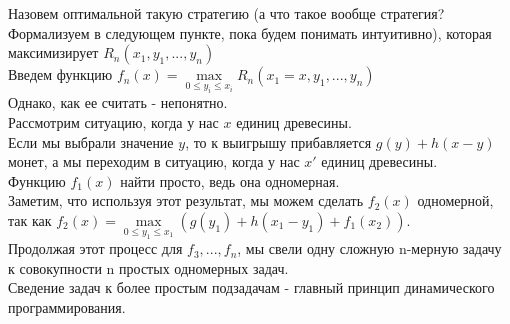 Назовем оптимальной такую стратегию (а что такое вообще стратегия? Формализуем в следующем пункте, пока будем понимать интуитивно), которая максимизирует $R_n(x_1, y_1, ..., y_n)$\\
Введем функцию $f_n(x) = \max\limits_{0 \leq y_i \leq x_i}R_n(x_1 = x, y_1, ..., y_n)$\\
Однако, как ее считать - непонятно.\\
Рассмотрим ситуацию, когда у нас $x$ единиц древесины.\\
Если мы выбрали значение $y$, то к выигрышу прибавляется $g(y) + h(x - y)$ монет, а мы переходим в ситуацию, когда у нас $x'$ единиц древесины.\\
Функцию $f_1(x)$ найти просто, ведь она одномерная.\\
Заметим, что используя этот результат, мы можем сделать $f_2(x)$ одномерной, так как $f_2(x) = \max\limits_{0 \leq y_1 \leq x_1}(g(y_1) + h(x_1 - y_1) + f_1(x_2))$.\\
Продолжая этот процесс для $f_3, ..., f_n$, мы свели одну сложную n-мерную задачу к совокупности n простых одномерных задач.\\
Сведение задач к более простым подзадачам - главный принцип динамического программирования.
